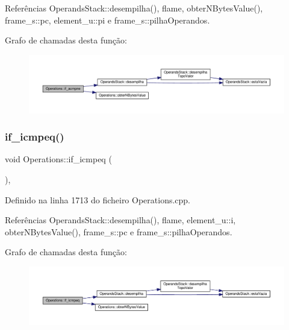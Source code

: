 Referências Operands\+Stack\+::desempilha(), flame, obter\+N\+Bytes\+Value(), frame\+\_\+s\+::pc, element\+\_\+u\+::pi e frame\+\_\+s\+::pilha\+Operandos.

Grafo de chamadas desta função\+:
\nopagebreak
\begin{figure}[H]
\begin{center}
\leavevmode
\includegraphics[width=350pt]{classOperations_a7f43bbfba9b2feb66b695d24c43dc430_cgraph}
\end{center}
\end{figure}
\mbox{\label{classOperations_a43a49ccd4f1160c0b1968af4296fa2b3}} 
\subsubsection{\texorpdfstring{if\+\_\+icmpeq()}{if\_icmpeq()}}
{\footnotesize\ttfamily void Operations\+::if\+\_\+icmpeq (\begin{DoxyParamCaption}{ }\end{DoxyParamCaption})\hspace{0.3cm}{\ttfamily [static]}, {\ttfamily [private]}}



Definido na linha 1713 do ficheiro Operations.\+cpp.



Referências Operands\+Stack\+::desempilha(), flame, element\+\_\+u\+::i, obter\+N\+Bytes\+Value(), frame\+\_\+s\+::pc e frame\+\_\+s\+::pilha\+Operandos.

Grafo de chamadas desta função\+:
\nopagebreak
\begin{figure}[H]
\begin{center}
\leavevmode
\includegraphics[width=350pt]{classOperations_a43a49ccd4f1160c0b1968af4296fa2b3_cgraph}
\end{center}
\end{figure}
\mbox{\label{classOperations_a147f088fabd19030a535ac68ff091be1}} 

